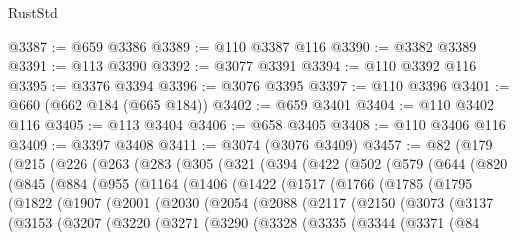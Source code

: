 \begin{lexlean}{RustStd}
\begin{coremodule}
{\begin{coremodule}
{{{{{{{{{{{{{{{{{{{{{{{{{{{{{{{{{{{{{{{{{{{{{{{@3387 := @659 @3386
@3389 := @110 @3387 @116
@3390 := @3382 @3389
@3391 := @113 @3390
@3392 := @3077 @3391
@3394 := @110 @3392 @116
@3395 := @3376 @3394
@3396 := @3076 @3395
@3397 := @110 @3396
@3401 := @660 (@662 @184 (@665 @184))
@3402 := @659 @3401
@3404 := @110 @3402 @116
@3405 := @113 @3404
@3406 := @658 @3405
@3408 := @110 @3406 @116
@3409 := @3397 @3408
@3411 := @3074 (@3076 @3409)
@3457 := @82
    (@179
      (@215
        (@226
          (@263
            (@283
              (@305
                (@321
                  (@394
                    (@422
                      (@502
                        (@579
                          (@644
                            (@820
                              (@845
                                (@884
                                  (@955
                                    (@1164
                                      (@1406
                                        (@1422
                                          (@1517
                                            (@1766
                                              (@1785
                                                (@1795
                                                  (@1822
                                                    (@1907
                                                      (@2001
                                                        (@2030
                                                          (@2054
                                                            (@2088
                                                              (@2117
                                                                (@2150
                                                                  (@3073
                                                                    (@3137
                                                                      (@3153
                                                                        (@3207
                                                                          (@3220
                                                                            (@3271
                                                                              (@3290
                                                                                (@3328
                                                                                  (@3335
                                                                                    (@3344
                                                                                      (@3371
                                                                                        (@84
}}}}}}}}}}}}}}}}}}}}}}}}}}}}}}}}}}}}}}}}}}}}}}}
\end{coremodule}}
\end{coremodule}
\end{lexlean}
